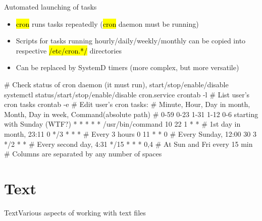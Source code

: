 \documentclass[compress, ucs, xelatex, 11pt, xcolor=svgnames, aspectratio=169,
	hyperref={
		bookmarks=true,
		unicode=true,
		colorlinks=true,
		pdftitle={Linux, command line and MetaCentrum},
		plainpages=false,
		pdfauthor={Vojtech Zeisek},
		pdfsubject={Course about use of Linux command line, writing shell scripts and using MetaCentrum of CESNET},
		pdfcreator={XeLaTeX},
		pdfkeywords={Linux, GNU, BASH, shell, command line, MetaCentrum},
		linkcolor=DarkRed, %
		anchorcolor=DarkBlue, %
		citecolor=Indigo, %
		filecolor=NavyBlue, %
		menucolor=DarkMagenta, %
		urlcolor=DarkBlue, %
		pdftex},
	url={hyphens, lowtilde} %
	]{beamer}
\renewcommand{\texttt}[1]{\hl{\ttfamily #1}}
\begin{document}
\begin{frame}[fragile]{Automated launching of tasks}
	\begin{itemize}
		\item \texttt{cron} runs tasks repeatedly (\texttt{cron} daemon must be running)
		\item Scripts for tasks running hourly/daily/weekly/monthly can be copied into respective \texttt{/etc/cron.*/} directories
		\item Can be replaced by SystemD timers (more complex, but more versatile)
	\end{itemize}
	\vfill
	\begin{bashcode}
    # Check status of cron daemon (it must run), start/stop/enable/disable
    systemctl status/start/stop/enable/disable cron.service
    crontab -l # List user's cron tasks
    crontab -e # Edit user's cron tasks:
    # Minute, Hour, Day in month, Month, Day in week, Command(absolute path)
    # 0-59    0-23  1-31          1-12   0-6 starting with Sunday (WTF?)
      *       *     *             *      *            /usr/bin/command
      10      22    1             *      *    # 1st day in month, 23:11
      0       */3   *             *      *    # Every 3 hours
      0       11    *             *      0    # Every Sunday, 12:00
      30      3     */2           *      *    # Every second day, 4:31
      */15    *     *             *      0,4  # At Sun and Fri every 15 min
    # Columns are separated by any number of spaces
	\end{bashcode}
\end{frame}

\section{Text}

\begin{frame}{Text}{Various aspects of working with text files}
	\tableofcontents[currentsection, sectionstyle=show/hide, hideothersubsections]
\end{frame}
\end{document}
